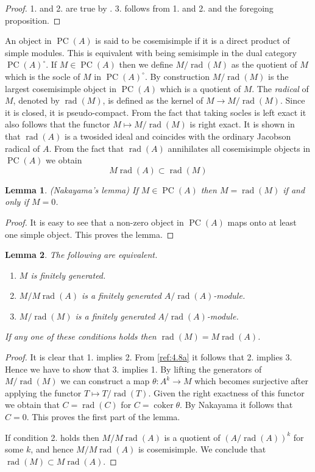 \documentclass{amsproc}
\def\rad{\operatorname {rad}}
\def\coker{\operatorname {coker}}
\def\r{\rightarrow}
\DeclareMathOperator{\PC}{PC}
\newtheorem{lemma}{Lemma}[section]
\theoremstyle{definition}
\theoremstyle{remark}
\numberwithin{equation}{section}
\numberwithin{table}{section}
\numberwithin{figure}{section}
\begin{document}
\begin{proof}
1. and 2. are true by \cite[Lemma 5.1]{VdBVG}. 3. follows from 1. and 2.
and the foregoing proposition.
\end{proof}



An object in $\PC(A)$ is said to be cosemisimple if it is a direct
product of simple modules. This is equivalent with being semisimple in
the dual category $\PC(A)^\circ$.  If $M\in \PC(A)$ then we define
$M/\rad(M)$ as  the quotient of $M$ which is the socle of $M$ in
$\PC(A)^\circ$. By construction $M/\rad(M)$ is the largest cosemisimple
object in $\PC(A)$ which is a quotient of $M$.
The \emph{radical} of $M$, denoted by $\rad(M)$, is  defined as the
kernel of $M\r M/\rad(M)$. Since  it is closed, it is pseudo-compact.
From the fact that taking socles is left exact it also follows that the
functor $M\mapsto M/\rad(M)$ is right exact. It is shown in
\cite{Gabriel} that $\rad(A)$ is a twosided ideal and coincides with
the ordinary Jacobson radical of $A$. From the fact that $\rad(A)$
annihilates all cosemisimple objects in $\PC(A)$ we obtain
\begin{equation}
\label{ref:4.8a}
M\rad(A)\subset \rad(M)
\end{equation}
\begin{lemma} 
\label{ref:4.8b}
(Nakayama's lemma) If $M\in \PC(A)$ then $M=\rad(M)$ if
and only if $M=0$.
\end{lemma}
\begin{proof} It is easy to see that a non-zero object in $\PC(A)$ maps 
onto at least one simple object. This proves the lemma.
\end{proof}
\begin{lemma}
\label{ref:4.9a}
The following are equivalent.
\begin{enumerate}
\item $M$ is finitely generated.
\item $M/M\rad(A)$ is a finitely generated $A/\rad(A)$-module.
\item $M/\rad(M)$ is a finitely generated $A/\rad(A)$-module.
\end{enumerate}
If any one of these conditions holds then $\rad(M)=M\rad(A)$.
\end{lemma}
\begin{proof}
It is clear that 1. implies 2. From \eqref{ref:4.8a} it follows 
that 2. implies 3. Hence we have to show that 3. implies 1.  By lifting
the generators of $M/\rad(M)$ we can construct a map $\theta:A^k\r M$
which becomes surjective after applying the functor $T\mapsto T/\rad(T)$.
Given the right exactness of this functor we obtain that $C=\rad(C)$
for $C=\coker \theta$. By Nakayama it follows that $C=0$. This proves
the first part of the lemma.

If condition 2. holds then $M/M\rad(A)$ is a quotient of $(A/\rad(A))^k$
for some $k$, and hence $M/M\rad(A)$ is cosemisimple. We conclude that
$\rad(M)\subset M\rad(A)$.
\end{proof}
\end{document}
